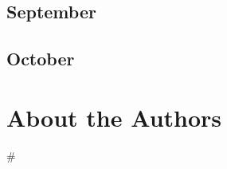 \documentclass[12pt,letterpaper,oneside]{memoir}
\newcommand\secdiv{
  \begin{center}
    \#
  \end{center}
}
\begin{document}
  \chapter{September}
  
  
  

  \chapter{October}
  
  

  \part{About the Authors}
  

  \newpage
  \secdiv
\end{document}
